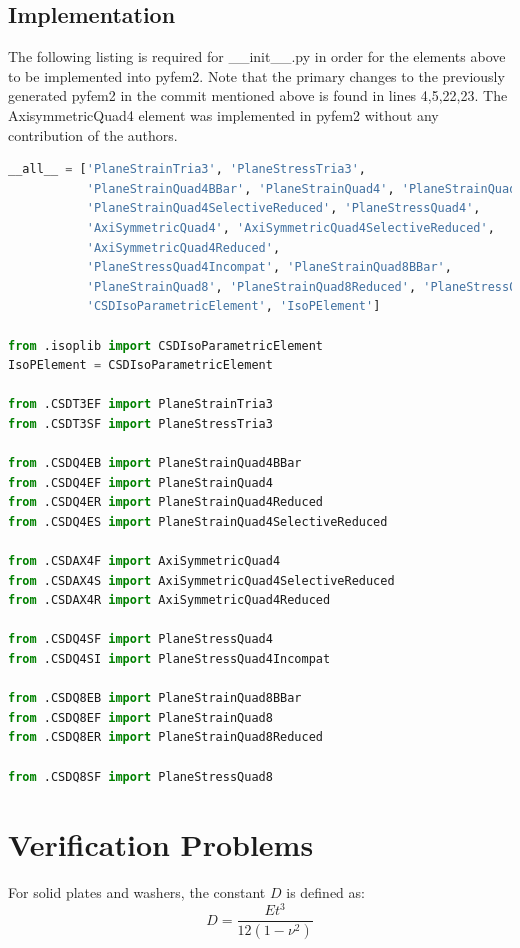 \documentclass[10pt,letterpaper]{report}
\numberwithin{equation}{chapter}
\begin{document}
\section{Implementation}
The following listing is required for \_\_init\_\_.py in order for the elements above to be implemented into pyfem2. Note that the primary changes to the previously generated pyfem2 in the commit mentioned above is found in lines 4,5,22,23. The AxisymmetricQuad4 element was implemented in pyfem2 without any contribution of the authors.
\begin{lstlisting}[language=Python]
__all__ = ['PlaneStrainTria3', 'PlaneStressTria3',
           'PlaneStrainQuad4BBar', 'PlaneStrainQuad4', 'PlaneStrainQuad4Reduced',
           'PlaneStrainQuad4SelectiveReduced', 'PlaneStressQuad4',
           'AxiSymmetricQuad4', 'AxiSymmetricQuad4SelectiveReduced',
           'AxiSymmetricQuad4Reduced',
           'PlaneStressQuad4Incompat', 'PlaneStrainQuad8BBar',
           'PlaneStrainQuad8', 'PlaneStrainQuad8Reduced', 'PlaneStressQuad8',
           'CSDIsoParametricElement', 'IsoPElement']

from .isoplib import CSDIsoParametricElement
IsoPElement = CSDIsoParametricElement

from .CSDT3EF import PlaneStrainTria3
from .CSDT3SF import PlaneStressTria3

from .CSDQ4EB import PlaneStrainQuad4BBar
from .CSDQ4EF import PlaneStrainQuad4
from .CSDQ4ER import PlaneStrainQuad4Reduced
from .CSDQ4ES import PlaneStrainQuad4SelectiveReduced

from .CSDAX4F import AxiSymmetricQuad4
from .CSDAX4S import AxiSymmetricQuad4SelectiveReduced
from .CSDAX4R import AxiSymmetricQuad4Reduced

from .CSDQ4SF import PlaneStressQuad4
from .CSDQ4SI import PlaneStressQuad4Incompat

from .CSDQ8EB import PlaneStrainQuad8BBar
from .CSDQ8EF import PlaneStrainQuad8
from .CSDQ8ER import PlaneStrainQuad8Reduced

from .CSDQ8SF import PlaneStressQuad8
\end{lstlisting}







\chapter{Verification Problems}
For solid plates and washers, the constant $D$ is defined as:
\[D = \frac{Et^3}{12(1- \nu ^2)}\]
\end{document}
